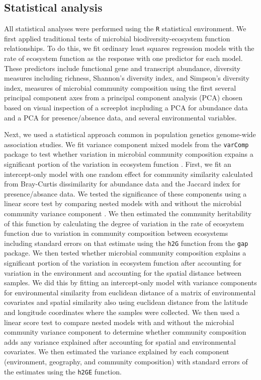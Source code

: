 \documentclass{article}
\begin{document}
\subsection{Statistical analysis}

All statistical analyses were performed using the \texttt{R} statistical
environment. 
We first applied traditional tests of microbial biodiversity-ecosystem function
relationships. To do this, we fit ordinary least squares regression models with
the rate of ecosystem function as the response with one predictor for each
model. These predictors include functional gene and transcript abundance,
diversity measures including richness, Shannon's diversity index, and Simpson's
diversity index, measures of microbial community composition using the first
several principal component axes from a principal component
analysis (PCA) chosen based on visual inspection of a screeplot incpluding a PCA for
abundance data and a PCA for presence/absence data, and several 
environmental variables. 

Next, we used a statistical approach common in population genetics genome-wide
association studies. We fit variance component mixed models from the
\texttt{varComp} package to test whether variation in microbial
community composition expains a significant portion of the variation in
ecosystem function \citep{qu2013}. First, we fit an intercept-only model with one random effect
for community similarity calculated from Bray-Curtis dissimilarity for abundance
data and the Jaccard index for presence/absance data. We tested the significance
of these components using a linear score test by comparing nested models with and
without the microbial community variance component \citep{qu2013}. We then estimated
the community heritability of this function by calculating the degree of
variation in the rate of ecosystem function due to variation in community
composition between ecosystems including standard errors on that estimate 
using the \texttt{h2G} function from the
\texttt{gap} package. We then tested whether microbial community composition explains a
significant portion of the variation in ecosystem function after accounting for
variation in the environment and accounting for the spatial distance between
samples. We did this by fitting an intercept-only model with variance components
for environmental similarity from euclidean distance of a matrix of
environmental covariates and spatial similarity
also using euclidean distance from the latitude and longitude coordinates where
the samples were collected. We then used a linear score test to compare
nested models with and without the microbial community variance component to
determine whether community composition adds any variance explained after
accounting for spatial and environmental covariates. We then estimated the
variance explained by each component (environment, geography, and community
composition) with standard errors of the estimates using the \texttt{h2GE}
function. 
\end{document}
